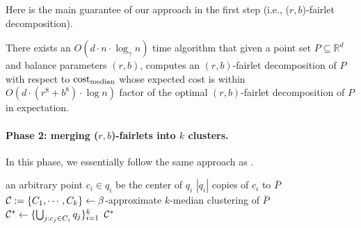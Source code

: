 Here is the main guarantee of our approach in the first step (i.e., ($r,b$)-fairlet decomposition).
\begin{theorem}\label{thm:main-fairlet}
There exists an $O(d\cdot n\cdot \log_{\gamma} n)$ time algorithm that given a point set $P \subseteq \mathbb{R}^d$ and balance parameters $(r,b)$, computes an $(r,b)$-fairlet decomposition of $P$ with respect to $\mathrm{cost}_{\mathrm{median}}$ whose expected cost is within $O(d\cdot (r^8+b^8)\cdot \log n)$ factor of the optimal $(r,b)$-fairlet decomposition of $P$ in expectation. 
\end{theorem}

\paragraph{Phase 2: merging ($r,b$)-fairlets into $k$ clusters.}
In this phase, we essentially follow the same approach as %
\cite{chierichetti2017fair}.
 
\begin{algorithm}
\caption{: the algorithm returns an $(r,b)$-fair $k$-median of $P$ given an ($r,b$)-fairlet decomposition $Q$ of $P$}\label{alg:fairlet-to-clusters}
\begin{algorithmic}[1]
		 an arbitrary point $c_i \in q_i$ be the center of $q_i$
		 $|q_i|$ copies of $c_i$ to $\bar{P}$
	\ENDFOR
	\STATE $\mathcal{C}:=\{C_1, \cdots, C_k\} \leftarrow \beta$-approximate $k$-median clustering of $\bar{P}$
	\STATE $\mathcal{C}^* \leftarrow \{\bigcup_{j: c_j \in C_i} q_j\}_{i=1}^k$ 
	\RETURN $\mathcal{C}^*$
\end{algorithmic}
\end{algorithm}


